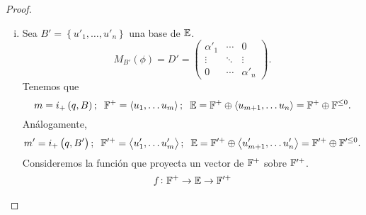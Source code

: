 \begin{proof}
\begin{enumerate}[i)]
\[\begin{aligned}
\begin{array}{cccccc}
                         &  & \alpha _m &  &  & \\
                         &  &  & 0 &  &   \\
                         &  & \ &  & \ddots &  \\
                         &  &  &  &  & 0 
                    \end{array} \right) \left(
                    \begin{array}{c}
                         \vdots  \\
                         x_i  \\
                         \vdots \\
                    \end{array} \right) = \alpha _i x_i \neq 0 \implies u \notin \E^{\perp}.
                \end{aligned}
            \]
            Así pues, $\E ^{\perp} = \left< u_{m+1} , \dots , u_n \right> .$
        \item
            Sea $B'=\left\{u'_1, \dots , u'_n \right\}$ una base  de $\mathbb{E}$.
            \[
                M_{B'}\left( \phi \right) = D' =  \left(
                \begin{array}{ccc}
                    \alpha ' _1 & \cdots & 0 \\
                    \vdots & \ddots & \vdots \\
                    0 & \cdots & \alpha ' _n 
                \end{array} \right).
            \]
            Tenemos que 
            \[
                m=i_+\left( q, B \right); \hspace{0,2cm} \F^+=\left<u_1, \dots u_m \right>;
                \hspace{0,2cm} \E=\F^+ \oplus \left<u_{m+1}, \dots u_n \right>=\F^+ \oplus \F^{ {\leq 0}}.
            \]
            Análogamente,
            \[
                m^\prime=i_+\left( q, B^\prime \right); \hspace{0,2cm} \F^{\prime +}=
                \left<u^\prime_1, \dots u^\prime_m \right>; \hspace{0,2cm} \E=\F^{\prime +}
                \oplus \left<u^{\prime}_{m+1}, \dots u^\prime_n \right>=\F^{\prime+}
                \oplus \F ^{\prime\leq 0}.
            \]
            Consideremos la función que proyecta un vector de $\mathbb{F}^+$ sobre $\mathbb{F}^{\prime+}$.
            \[
                \begin{aligned}
                    f \colon \F^+ &\to \E \to \F^{\prime+} \\

\end{aligned}\]
\end{enumerate}
\end{proof}
